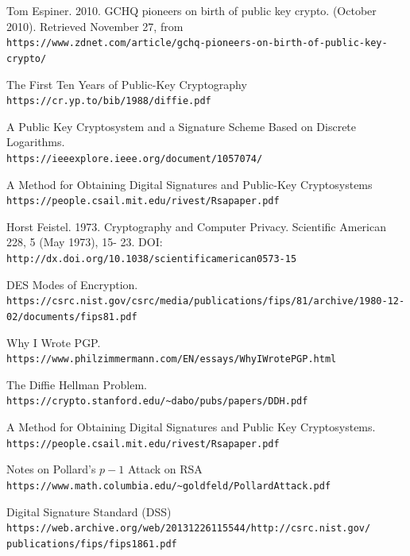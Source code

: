\documentclass[12pt]{report}
\begin{document}
\begin{thebibliography}{9}

    Tom Espiner. 2010. GCHQ pioneers on birth of public key crypto. (October 2010). Retrieved November 27, from \\
    \texttt{https://www.zdnet.com/article/gchq-pioneers-on-birth-of-public-key-crypto/}

    The First Ten Years of Public-Key Cryptography\\
    \texttt{https://cr.yp.to/bib/1988/diffie.pdf}

    A Public Key Cryptosystem and a Signature Scheme Based on Discrete Logarithms.\\
    \texttt{https://ieeexplore.ieee.org/document/1057074/}

    A Method for Obtaining Digital Signatures and Public-Key Cryptosystems\\
    \texttt{https://people.csail.mit.edu/rivest/Rsapaper.pdf}

    Horst Feistel. 1973. Cryptography and Computer Privacy. Scientific American 228, 5 (May 1973), 15-
    23. DOI: \\
    \texttt{http://dx.doi.org/10.1038/scientificamerican0573-15}

    DES Modes of Encryption. \\
    \texttt{https://csrc.nist.gov/csrc/media/publications/fips/81/archive/1980-12-02/documents/fips81.pdf}

    Why I Wrote PGP.\\
    \texttt{https://www.philzimmermann.com/EN/essays/WhyIWrotePGP.html}

    The Diffie Hellman Problem.\\
    \texttt{https://crypto.stanford.edu/\~{}dabo/pubs/papers/DDH.pdf}

    A Method for Obtaining Digital Signatures and Public Key Cryptosystems.\\
    \texttt{https://people.csail.mit.edu/rivest/Rsapaper.pdf}

    Notes on Pollard's $p-1$ Attack on RSA\\
    \texttt{https://www.math.columbia.edu/\~{}goldfeld/PollardAttack.pdf}

    Digital Signature Standard (DSS)\\
    \texttt{https://web.archive.org/web/20131226115544/http://csrc.nist.gov/\\publications/fips/fips1861.pdf}


\end{thebibliography}
\end{document}
